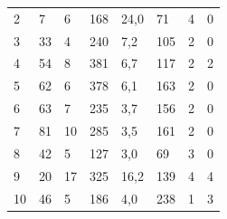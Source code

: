 \documentclass[a4paper,titlepage]{artikel1}
\begin{document}
\begin{itemize}
\begin{center}
\begin{tabular}{|l|l|l|l|l|l|l|l|}
         2 & 7 & 6 & 168 & 24,0 & 71 & 4 & 0 \\
         3 & 33 & 4 & 240 & 7,2 & 105 & 2 & 0 \\
         4 & 54 & 8 & 381 & 6,7& 117 & 2 & 2 \\
         5 & 62 & 6 & 378 & 6,1 & 163 & 2 & 0 \\
         6 & 63 & 7 & 235 & 3,7 & 156 & 2 & 0 \\
         7 & 81 & 10  & 285 & 3,5 & 161 & 2 & 0 \\
         8 & 42 & 5 & 127 & 3,0 & 69 & 3 & 0 \\
         9 & 20 & 17 & 325 & 16,2 & 139 & 4 & 4 \\
         10 & 46 & 5 & 186 & 4,0 & 238 & 1 & 3 \\
         \hline
       \end{tabular}
       \end{center}
       

\end{itemize}
\end{document}
